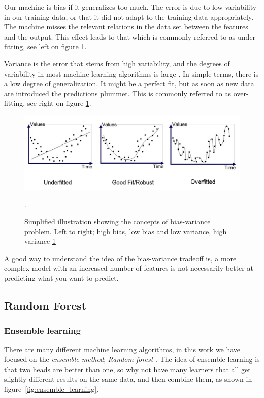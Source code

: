 Our machine is bias if it generalizes too much. The error is due to low variability in our training data, or that it did not adapt to the training data appropriately. The machine misses the relevant relations in the data set between the features and the output. This effect leads to that which is commonly referred to as under-fitting, see left on figure \ref{fig:bias_var}.

Variance is the error that stems from high variability, and the degrees of variability in most machine learning algorithms is large \cite{marsland2014machine}. In simple terms, there is a low degree of generalization. It might be a perfect fit, but as soon as new data are introduced the predictions plummet. This is commonly referred to as over-fitting, see right on figure \ref{fig:bias_var}.

\begin{figure}[h]
     \centering
     \includegraphics[width=\linewidth]{theory/figures/Bias_variance.png}
     \caption{Simplified illustration showing the concepts of bias-variance problem. Left to right; high bias, low bias and low variance, high variance \ref{fig:bias_var}}.
     \label{fig:bias_var}
\end{figure}

A good way to understand the idea of the bias-variance tradeoff is, a more complex model with an increased number of features is not necessarily better at predicting what you want to predict.


\subsection{Random Forest}

\subsubsection{Ensemble learning}
	There are many different machine learning algorithms, in this work we have focused on the \textit{ensemble method}; \textit{Random forest} \cite{breiman2001random}. The idea of ensemble learning is that two heads are better than one, so why not have many learners that all get slightly different results on the same data, and then combine them, as shown in figure \ref{fig:ensemble_learning}.
	
